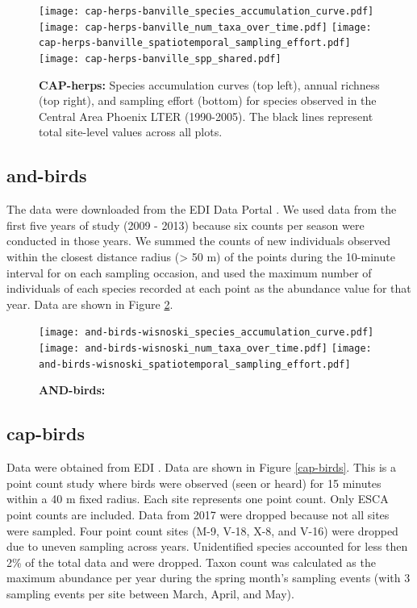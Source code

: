 \documentclass[11pt, oneside]{article}
\begin{document}
\begin{figure}[h!]
\centering
\texttt{[image: cap-herps-banville\_species\_accumulation\_curve.pdf]}
\texttt{[image: cap-herps-banville\_num\_taxa\_over\_time.pdf]}
\texttt{[image: cap-herps-banville\_spatiotemporal\_sampling\_effort.pdf]}
\texttt{[image: cap-herps-banville\_spp\_shared.pdf]}
\caption{{\bf CAP-herps:} Species accumulation curves (top left),  annual richness (top right), and sampling effort (bottom)  for species observed in the Central Area Phoenix LTER (1990-2005). The black lines represent total site-level values across all plots.}
\label{cap-herps}
\end{figure}


\subsection {and-birds}
The data were downloaded from the EDI Data Portal \citep{and-birds}.
We used data from the first five years of study (2009 - 2013) because six counts per season were conducted in those years.
We summed the counts of new individuals observed within the closest distance radius (> 50 m)  of the points during the 10-minute interval for on each sampling occasion, and used the maximum number of individuals of each species recorded at each point as the abundance value for that year.
Data are shown in Figure \ref{and-birds}.

\begin{figure}[h!]
\centering
\texttt{[image: and-birds-wisnoski\_species\_accumulation\_curve.pdf]}
\texttt{[image: and-birds-wisnoski\_num\_taxa\_over\_time.pdf]}
\texttt{[image: and-birds-wisnoski\_spatiotemporal\_sampling\_effort.pdf]}
\caption{{\bf AND-birds:} }
\label{and-birds}
\end{figure}


\subsection{cap-birds}
Data were obtained from EDI \citep{cap-birds}.
Data are shown in Figure \ref{cap-birds}.
This is a point count study where birds were observed (seen or heard) for 15 minutes within a 40 m fixed radius. 
Each site represents one point count. 
Only ESCA point counts are included. 
Data from 2017 were dropped because not all sites were sampled. 
Four point count sites (M-9, V-18, X-8, and V-16) were dropped due to uneven sampling across years. 
Unidentified species accounted for less then 2\% of the total data and were dropped. 
Taxon count was calculated as the maximum abundance per year during the spring month's sampling events (with 3 sampling events per site between March, April, and May). 
  
\end{document}
